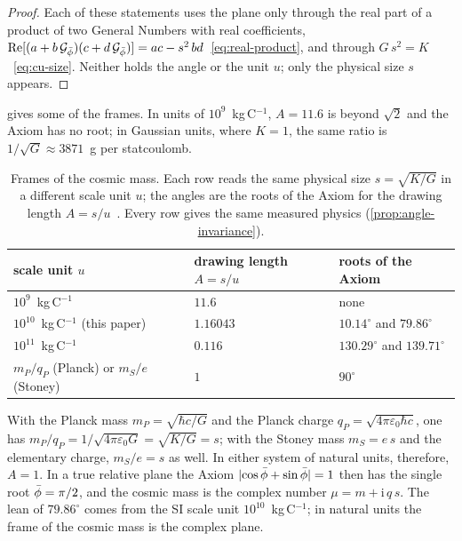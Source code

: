 \begin{proof}
Each of these statements uses the plane only through the real part of a product of two General Numbers with real coefficients, $\operatorname{Re}[(a + b\,\mathcal{G}_{\bar{\phi}})(c + d\,\mathcal{G}_{\bar{\phi}})] = ac - s^2\,bd$~\cref{eq:real-product}, and through $G\,s^2 = K$~\cref{eq:cu-size}. Neither holds the angle or the unit $u$; only the physical size $s$ appears.
\end{proof}

 gives some of the frames. In units of $10^{9}$~kg\,C$^{-1}$, $A = 11.6$ is beyond $\sqrt2$ and the Axiom has no root; in Gaussian units, where $K = 1$, the same ratio is $1/\sqrt{G} \approx 3871$~g per statcoulomb.

\begin{table}[t]
\caption{Frames of the cosmic mass. Each row reads the same physical size $s = \sqrt{K/G}$ in a different scale unit $u$; the angles are the roots of the Axiom for the drawing length $A = s/u$~\citep[Theorem~3.6]{DerrazGN2026}. Every row gives the same measured physics (\cref{prop:angle-invariance}).}
\label{tab:frames}
\small\centering
\begin{tabular}{@{}lll@{}}
\toprule
scale unit $u$ & drawing length $A = s/u$ & roots of the Axiom \\
\midrule
$10^{9}$~kg\,C$^{-1}$ & $11.6$ & none \\
$10^{10}$~kg\,C$^{-1}$ (this paper) & $1.16043$ & $10.14^\circ$ and $79.86^\circ$ \\
$10^{11}$~kg\,C$^{-1}$ & $0.116$ & $130.29^\circ$ and $139.71^\circ$ \\
$m_P/q_P$ (Planck) or $m_S/e$ (Stoney) & $1$ & $90^\circ$ \\
\bottomrule
\end{tabular}
\end{table}

\begin{remark}\label{rem:natural-units}
With the Planck mass $m_P = \sqrt{\hbar c/G}$ and the Planck charge $q_P = \sqrt{4\pi\varepsilon_0\hbar c}$, one has $m_P/q_P = 1/\sqrt{4\pi\varepsilon_0 G} = \sqrt{K/G} = s$; with the Stoney mass $m_S = e\,s$ and the elementary charge, $m_S/e = s$ as well. In either system of natural units, therefore, $A = 1$. In a true relative plane the Axiom $\lvert\cos\bar{\phi} + \sin\bar{\phi}\rvert = 1$ then has the single root $\bar{\phi} = \pi/2$, and the cosmic mass is the complex number $\mu = m + \mathrm{i}\,q\,s$. The lean of $79.86^\circ$ comes from the SI scale unit $10^{10}$~kg\,C$^{-1}$; in natural units the frame of the cosmic mass is the complex plane.
\end{remark}

